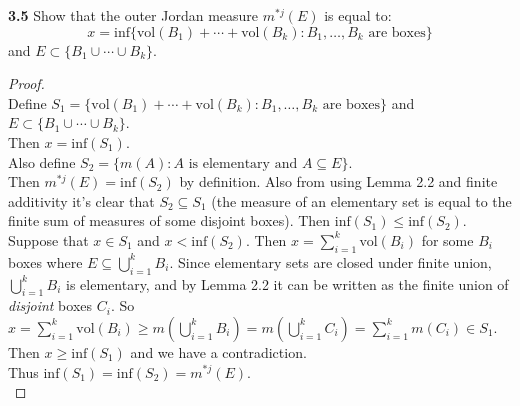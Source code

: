 \documentclass[12pt]{article}
\begin{document}
\hspace{-4 ex}\textbf{3.5} Show that the outer Jordan measure $m^{*j}(E)$ is equal to: $$x = \text{inf}\{\text{vol}(B_1)+\cdots+\text{vol}(B_k) : B_1,\ldots,B_k  \text{ are boxes} \}$$ and $E\subset \{B_1\cup\cdots\cup B_k\}$. \bigbreak

	\begin{proof}  \text{ }\\
		Define $S_1 =  \{\text{vol}(B_1)+\cdots+\text{vol}(B_k) : B_1,\ldots,B_k  \text{ are boxes} \}$ and $E\subset \{B_1\cup\cdots\cup B_k\}$. \\
		Then $x = \text{inf}(S_1)$. \\
		Also define $S_2 = \{m(A) : A \text{ is elementary and } A \subseteq E \}$. \\
		Then $m^{*j}(E) = \text{inf}(S_2)$ by definition. Also from using Lemma 2.2 and finite additivity it's clear that $S_2 \subseteq S_1$ (the measure of an elementary set is equal to the finite sum of measures of some disjoint boxes). Then $\text{inf}(S_1) \leq \text{inf}(S_2)$.\\
		
		Suppose that $x \in S_1$ and $ x < \text{inf}(S_2)$. Then $x = \sum\limits_{i=1}^k \text{vol}(B_i)$ for some $B_i$ boxes where $E \subseteq \bigcup\limits_{i=1}^{k}B_i$. Since elementary sets are closed under finite union,  $\bigcup\limits_{i=1}^{k}B_i$ is elementary, and by Lemma 2.2 it can be written as the finite union of \textit{disjoint} boxes $C_i$. So $x = \sum\limits_{i=1}^k \text{vol}(B_i) \geq m(\bigcup\limits_{i=1}^{k}B_i) = m(\bigcup\limits_{i=1}^{k}C_i) = \sum\limits_{i=1}^{k}m(C_i) \in S_1$. Then $x \geq \text{inf}(S_1)$ and we have a contradiction. \\
		Thus $\text{inf}(S_1) = \text{inf}(S_2) = m^{*j}(E)$. \\


\end{proof}
\end{document}

